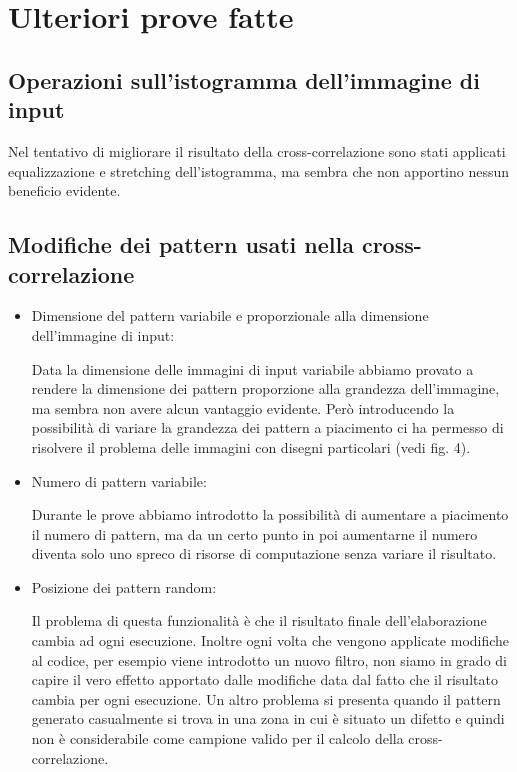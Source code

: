\documentclass{article}
\begin{document}
\newpage


\section{Ulteriori prove fatte}

\subsection{Operazioni sull'istogramma dell'immagine di input}

Nel tentativo di migliorare il risultato della cross-correlazione sono stati applicati
equalizzazione e stretching dell'istogramma, ma sembra che non apportino nessun beneficio
evidente.

\subsection{Modifiche dei pattern usati nella cross-correlazione}

\begin{itemize}
  \item Dimensione del pattern variabile e proporzionale alla dimensione dell'immagine di input:
  
  Data la dimensione delle immagini di input variabile abbiamo provato a rendere la
  dimensione dei pattern proporzione alla grandezza dell'immagine, ma sembra non avere alcun
  vantaggio evidente.
  Però introducendo la possibilità di variare la grandezza dei pattern a piacimento ci ha permesso 
  di risolvere il problema delle immagini con disegni particolari (vedi fig. 4).

  \item Numero di pattern variabile:
  
  Durante le prove abbiamo introdotto la possibilità di aumentare a piacimento il numero di
  pattern, ma da un certo punto in poi aumentarne il numero diventa solo uno spreco di risorse
  di computazione senza variare il risultato.
  
  \item Posizione dei pattern random:
  
  Il problema di questa funzionalità è che il risultato finale dell'elaborazione cambia ad ogni
  esecuzione.
  Inoltre ogni volta che vengono applicate modifiche al codice, per esempio viene introdotto un
  nuovo filtro, non siamo in grado di capire il vero effetto apportato dalle modifiche data dal
  fatto che il risultato cambia per ogni esecuzione.
  Un altro problema si presenta quando il pattern generato casualmente si trova in una zona in cui è situato un difetto e quindi non è considerabile come campione valido per il calcolo della cross-correlazione.
  
  
\end{itemize}
\end{document}
